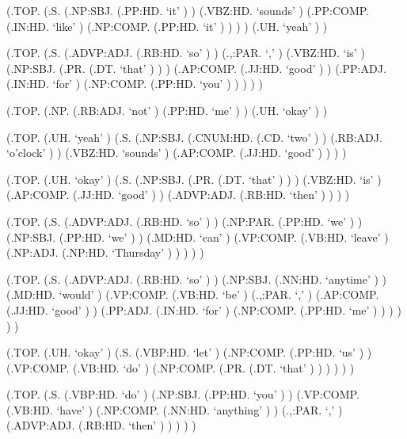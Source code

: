 \documentclass[10pt]{article}
\begin{document}
\begin{parsetree}  (.TOP. (.S. (.NP:SBJ. (.PP:HD. `it' ) ) (.VBZ:HD. `sounds' ) (.PP:COMP. (.IN:HD. `like' ) (.NP:COMP. (.PP:HD. `it' ) ) ) ) (.UH. `yeah' ) ) \end{parsetree}

\begin{parsetree}  (.TOP. (.S. (.ADVP:ADJ. (.RB:HD. `so' ) ) (.,:PAR. `,' ) (.VBZ:HD. `is' ) (.NP:SBJ. (.PR. (.DT. `that' ) ) ) (.AP:COMP. (.JJ:HD. `good' ) ) (.PP:ADJ. (.IN:HD. `for' ) (.NP:COMP. (.PP:HD. `you' ) ) ) ) ) \end{parsetree}

\begin{parsetree}  (.TOP. (.NP. (.RB:ADJ. `not' ) (.PP:HD. `me' ) ) (.UH. `okay' ) ) \end{parsetree}

\begin{parsetree}  (.TOP. (.UH. `yeah' ) (.S. (.NP:SBJ. (.CNUM:HD. (.CD. `two' ) ) (.RB:ADJ. `o'clock' ) ) (.VBZ:HD. `sounds' ) (.AP:COMP. (.JJ:HD. `good' ) ) ) ) \end{parsetree}

\begin{parsetree}  (.TOP. (.UH. `okay' ) (.S. (.NP:SBJ. (.PR. (.DT. `that' ) ) ) (.VBZ:HD. `is' ) (.AP:COMP. (.JJ:HD. `good' ) ) (.ADVP:ADJ. (.RB:HD. `then' ) ) ) ) \end{parsetree}

\begin{parsetree}  (.TOP. (.S. (.ADVP:ADJ. (.RB:HD. `so' ) ) (.NP:PAR. (.PP:HD. `we' ) ) (.NP:SBJ. (.PP:HD. `we' ) ) (.MD:HD. `can' ) (.VP:COMP. (.VB:HD. `leave' ) (.NP:ADJ. (.NP:HD. `Thursday' ) ) ) ) ) \end{parsetree}

\begin{parsetree}  (.TOP. (.S. (.ADVP:ADJ. (.RB:HD. `so' ) ) (.NP:SBJ. (.NN:HD. `anytime' ) ) (.MD:HD. `would' ) (.VP:COMP. (.VB:HD. `be' ) (.,:PAR. `,' ) (.AP:COMP. (.JJ:HD. `good' ) ) (.PP:ADJ. (.IN:HD. `for' ) (.NP:COMP. (.PP:HD. `me' ) ) ) ) ) ) \end{parsetree}

\begin{parsetree}  (.TOP. (.UH. `okay' ) (.S. (.VBP:HD. `let' ) (.NP:COMP. (.PP:HD. `us' ) ) (.VP:COMP. (.VB:HD. `do' ) (.NP:COMP. (.PR. (.DT. `that' ) ) ) ) ) ) \end{parsetree}

\begin{parsetree}  (.TOP. (.S. (.VBP:HD. `do' ) (.NP:SBJ. (.PP:HD. `you' ) ) (.VP:COMP. (.VB:HD. `have' ) (.NP:COMP. (.NN:HD. `anything' ) ) (.,:PAR. `,' ) (.ADVP:ADJ. (.RB:HD. `then' ) ) ) ) ) \end{parsetree}
\end{document}

